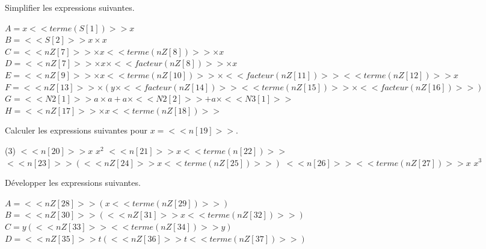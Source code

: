 \begin{multicols}{2}
\begin{center}
\end{center}


\exo{}

Simplifier les expressions suivantes.

\begin{multicols}{2}
$A=x <<terme(S[1])>> x$\\
$B=<<S[2]>>x\times x$\\
$C=<<nZ[7]>>\times x <<terme(nZ[8])>>\times x$\\
$D=<<nZ[7]>>\times x\times <<facteur(nZ[8])>>\times x$\\
$E=<<nZ[9]>> \times x<<terme(nZ[10])>>\times <<facteur(nZ[11])>> <<terme(nZ[12])>> x$\\
$F=<<nZ[13]>> \times (y\times <<facteur(nZ[14])>> <<terme(nZ[15])>> \times <<facteur(nZ[16])>>)$\\
$G=<<N2[1]>> a\times  a+a\times <<N2[2]>>+a\times <<N3[1]>>$\\
$H= <<nZ[17]>>\times x <<terme(nZ[18])>>$
\end{multicols}



\exo{}

Calculer les expressions suivantes pour $x=<<n[19]>>$.

\begin{tasks}[counter-format = {tsk[1].},label-format={\bfseries}](3)
	\task $<<n[20]>> x$ 
	\task $x^2$
	\task $<<n[21]>>x <<terme(n[22])>> $
	\task $ <<n[23]>> (<<nZ[24]>> x <<terme(nZ[25])>>)$
	\task $ <<n[26]>>  <<terme(nZ[27])>> x$
	\task $x^3$
\end{tasks}

\exo{}

Développer les expressions suivantes.

\begin{multicols}{2}
$A=  <<nZ[28]>> (x  <<terme(nZ[29])>>)$\\
$B= <<nZ[30]>> ( <<nZ[31]>> x    <<terme(nZ[32])>>)$\\
$C=y( <<nZ[33]>>  <<terme(nZ[34])>> y)$\\
$D= <<nZ[35]>>  t(  <<nZ[36]>> t <<terme(nZ[37])>>)$
\end{multicols}







\raggedcolumns
\end{multicols}

\exon{}

